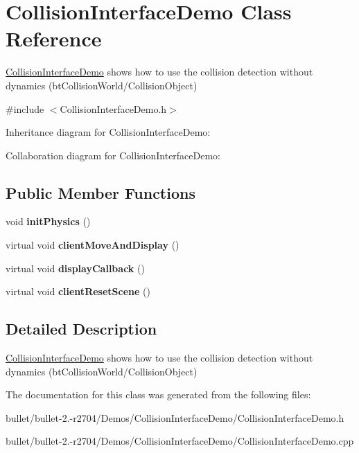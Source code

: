 \hypertarget{class_collision_interface_demo}{\section{Collision\+Interface\+Demo Class Reference}
\label{class_collision_interface_demo}
}


\hyperlink{class_collision_interface_demo}{Collision\+Interface\+Demo} shows how to use the collision detection without dynamics (bt\+Collision\+World/\+Collision\+Object)  




{\ttfamily \#include $<$Collision\+Interface\+Demo.\+h$>$}



Inheritance diagram for Collision\+Interface\+Demo\+:


Collaboration diagram for Collision\+Interface\+Demo\+:
\subsection*{Public Member Functions}
\begin{DoxyCompactItemize}
\item 
\hypertarget{class_collision_interface_demo_ab6415e109437158adef194f123694d41}{void {\bfseries init\+Physics} ()}\label{class_collision_interface_demo_ab6415e109437158adef194f123694d41}

\item 
\hypertarget{class_collision_interface_demo_a40e7b7dded4cbe70956a82f5f819fd3a}{virtual void {\bfseries client\+Move\+And\+Display} ()}\label{class_collision_interface_demo_a40e7b7dded4cbe70956a82f5f819fd3a}

\item 
\hypertarget{class_collision_interface_demo_a382119f1ab5611fc8db81ddaf152c969}{virtual void {\bfseries display\+Callback} ()}\label{class_collision_interface_demo_a382119f1ab5611fc8db81ddaf152c969}

\item 
\hypertarget{class_collision_interface_demo_a9c4c57a8d92c0de23136b0b60e05244c}{virtual void {\bfseries client\+Reset\+Scene} ()}\label{class_collision_interface_demo_a9c4c57a8d92c0de23136b0b60e05244c}

\end{DoxyCompactItemize}


\subsection{Detailed Description}
\hyperlink{class_collision_interface_demo}{Collision\+Interface\+Demo} shows how to use the collision detection without dynamics (bt\+Collision\+World/\+Collision\+Object) 

The documentation for this class was generated from the following files\+:\begin{DoxyCompactItemize}
\item 
bullet/bullet-\/2.-\/r2704/\+Demos/\+Collision\+Interface\+Demo/Collision\+Interface\+Demo.\+h\item 
bullet/bullet-\/2.-\/r2704/\+Demos/\+Collision\+Interface\+Demo/Collision\+Interface\+Demo.\+cpp\end{DoxyCompactItemize}
